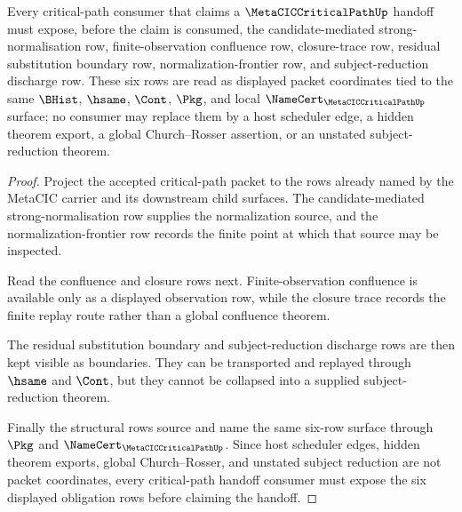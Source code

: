 \begin{theorem}
\label{thm:metacic-critical-path-split-obligation-surface}
Every critical-path consumer that claims a $\MetaCICCriticalPathUp$ handoff must expose, before the claim is consumed, the candidate-mediated strong-normalisation row, finite-observation confluence row, closure-trace row, residual substitution boundary row, normalization-frontier row, and subject-reduction discharge row. These six rows are read as displayed packet coordinates tied to the same $\BHist$, $\hsame$, $\Cont$, $\Pkg$, and local $\NameCert_{\MetaCICCriticalPathUp}$ surface; no consumer may replace them by a host scheduler edge, a hidden theorem export, a global Church--Rosser assertion, or an unstated subject-reduction theorem.
\end{theorem}
\begin{proof}
Project the accepted critical-path packet to the rows already named by the MetaCIC carrier and its downstream child surfaces. The candidate-mediated strong-normalisation row supplies the normalization source, and the normalization-frontier row records the finite point at which that source may be inspected.

Read the confluence and closure rows next. Finite-observation confluence is available only as a displayed observation row, while the closure trace records the finite replay route rather than a global confluence theorem.

The residual substitution boundary and subject-reduction discharge rows are then kept visible as boundaries. They can be transported and replayed through $\hsame$ and $\Cont$, but they cannot be collapsed into a supplied subject-reduction theorem.

Finally the structural rows source and name the same six-row surface through $\Pkg$ and $\NameCert_{\MetaCICCriticalPathUp}$. Since host scheduler edges, hidden theorem exports, global Church--Rosser, and unstated subject reduction are not packet coordinates, every critical-path handoff consumer must expose the six displayed obligation rows before claiming the handoff.
\end{proof}
